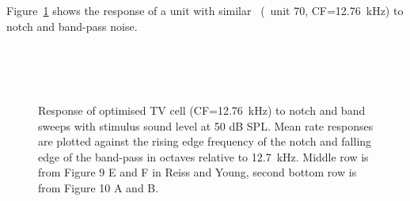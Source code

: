 

Figure~\ref{fig:TV_SweepUnit70} shows the response of a unit with similar \CF~(\TV~unit 70, CF=12.76~kHz) to notch and band-pass noise.

\begin{figure}[htb]
  \centering
  \\
  \\
  \\
  \caption[Response of optimised TV cell (CF=12.76~kHz) to notch and band   sweeps]{Response of optimised TV cell (CF=12.76~kHz) to notch and band sweeps with stimulus sound level at 50 dB SPL\@.
Mean rate responses are plotted against the rising edge frequency of the notch and falling edge of the band-pass in octaves relative to 12.7~kHz.
Middle row is from Figure 9 E and F in Reiss and Young, second bottom row is from Figure 10 A and B. }   \label{fig:TV_SweepUnit70}
\end{figure}







